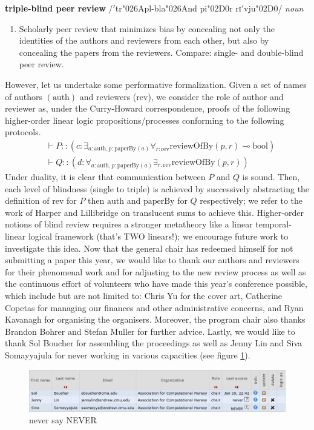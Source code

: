 \documentclass[12pt]{article}
\newcommand{\auth}{\text{auth}}
\newcommand{\paperby}{\text{paperBy}}
\newcommand{\reviewofby}{\text{reviewOfBy}}
\newcommand{\bool}{\text{bool}}
\newcommand{\rev}{\text{rev}}
\begin{document}
\textbf{triple-blind peer review} /$'$tr\char"026Apl-bla\char"026And pi\char"02D0r rɪ$'$vju\char"02D0/ \emph{noun}
\begin{enumerate}
\item Scholarly peer review that minimizes bias by concealing not only the identities of the authors and reviewers from each other, but also by concealing the papers from the reviewers. Compare: single- and double-blind peer review.
\end{enumerate}
However, let us undertake some performative formalization. Given a set of names of authors $(\auth)$ and reviewers ($\rev$), we consider the role of author and reviewer as, under the Curry-Howard correspondence, proofs of the following higher-order linear logic propositions/processes conforming to the following protocols.
\begin{align*}
&\vdash P::(c:\exists_{a:\auth,p:\paperby(a)}\forall_{r:\rev}\reviewofby(p, r)\multimap\bool)\\
&\vdash Q::(d:\forall_{a:\auth,p:\paperby(a)}\exists_{r:\rev}\reviewofby(p, r))
\end{align*}
Under duality, it is clear that communication between $P$ and $Q$ is sound. Then, each level of blindness (single to triple) is achieved by successively abstracting the definition of $\rev$ for $P$ then $\auth$ and $\paperby$ for $Q$ respectively; we refer to the work of Harper and Lillibridge \cite{harper+:sharing} on translucent sums to achieve this. Higher-order notions of blind review requires a stronger metatheory like a linear temporal-linear logical framework (that’s TWO linears!); we encourage future work to investigate this idea.
Now that the general chair has redeemed himself for not submitting a paper this year, we would like to thank our authors and reviewers for their phenomenal work and for adjusting to the new review process as well as the continuous effort of volunteers who have made this year’s conference possible, which include but are not limited to: Chris Yu for the cover art, Catherine Copetas for managing our finances and other administrative concerns, and Ryan Kavanagh for organising the organisers. Moreover, the program chair also thanks Brandon Bohrer and Stefan Muller for further advice. Lastly, we would like to thank Sol Boucher for assembling the proceedings as well as Jenny Lin and Siva Somayyajula for never working in various capacities (see figure \ref{fig:never}).
\begin{figure}
\centering
\includegraphics[width=\textwidth]{never.png}
\caption{never say NEVER}
\label{fig:never}
\end{figure}
\end{document}
